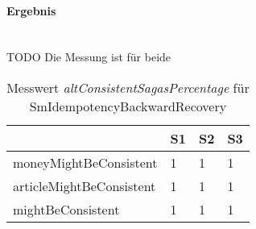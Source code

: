 \paragraph*{Ergebnis} \mbox{}\\
TODO %
Die Messung ist für beide 

\begin{center}
	\fontsize{9}{12}\selectfont
	\begin{longtable}[h]{|p{4cm}|p{1cm}|p{1cm}|p{1cm}|}
		\hline
		 & S1 & S2 & S3 \\ \hline
		\endhead
		\caption{Messwert \textit{altConsistentSagasPercentage} für SmIdempotencyBackwardRecovery}
		\label{tab:smbasic_stateanalysisresult}
		\endfoot
		moneyMightBeConsistent & 1 & 1 & 1 \\ \hline	
		articleMightBeConsistent & 1 & 1 & 1 \\ \hline
		mightBeConsistent & 1 & 1 & 1 \\ \hline
	\end{longtable}
\end{center}
\FloatBarrier
